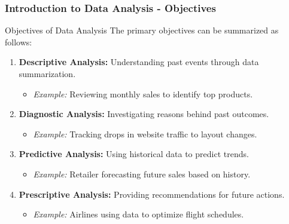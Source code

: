 \documentclass{beamer}
\begin{document}
\begin{frame}[fragile]
    \frametitle{Introduction to Data Analysis - Objectives}
    \begin{block}{Objectives of Data Analysis}
        The primary objectives can be summarized as follows:
    \end{block}

    \begin{enumerate}
        \item \textbf{Descriptive Analysis:} Understanding past events through data summarization.
            \begin{itemize}
                \item \textit{Example:} Reviewing monthly sales to identify top products.
            \end{itemize}
        
        \item \textbf{Diagnostic Analysis:} Investigating reasons behind past outcomes.
            \begin{itemize}
                \item \textit{Example:} Tracking drops in website traffic to layout changes.
            \end{itemize}
        
        \item \textbf{Predictive Analysis:} Using historical data to predict trends.
            \begin{itemize}
                \item \textit{Example:} Retailer forecasting future sales based on history.
            \end{itemize}
        
        \item \textbf{Prescriptive Analysis:} Providing recommendations for future actions.
            \begin{itemize}
                \item \textit{Example:} Airlines using data to optimize flight schedules.
            \end{itemize}
    \end{enumerate}
\end{frame}
\end{document}
